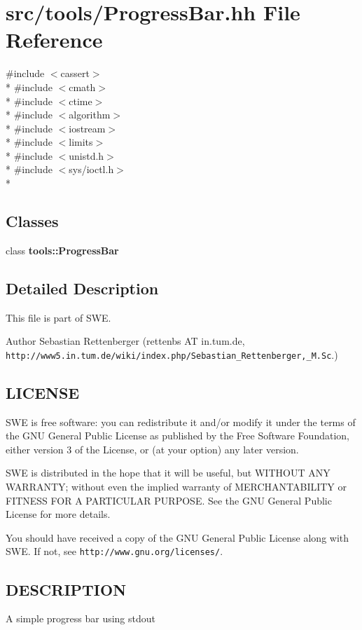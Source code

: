 \section{src/tools/\-Progress\-Bar.hh File Reference}
\label{ProgressBar_8hh}
{\ttfamily \#include $<$cassert$>$}\\*
{\ttfamily \#include $<$cmath$>$}\\*
{\ttfamily \#include $<$ctime$>$}\\*
{\ttfamily \#include $<$algorithm$>$}\\*
{\ttfamily \#include $<$iostream$>$}\\*
{\ttfamily \#include $<$limits$>$}\\*
{\ttfamily \#include $<$unistd.\-h$>$}\\*
{\ttfamily \#include $<$sys/ioctl.\-h$>$}\\*
\subsection*{Classes}
\begin{DoxyCompactItemize}
\item 
class {\bf tools\-::\-Progress\-Bar}
\end{DoxyCompactItemize}


\subsection{Detailed Description}
This file is part of S\-W\-E.

\begin{DoxyAuthor}{Author}
Sebastian Rettenberger (rettenbs A\-T in.\-tum.\-de, {\tt http\-://www5.\-in.\-tum.\-de/wiki/index.\-php/\-Sebastian\-\_\-\-Rettenberger,\-\_\-\-M.\-Sc}.)
\end{DoxyAuthor}
\subsection{L\-I\-C\-E\-N\-S\-E}\label{Writer_8hh_LICENSE}
S\-W\-E is free software\-: you can redistribute it and/or modify it under the terms of the G\-N\-U General Public License as published by the Free Software Foundation, either version 3 of the License, or (at your option) any later version.

S\-W\-E is distributed in the hope that it will be useful, but W\-I\-T\-H\-O\-U\-T A\-N\-Y W\-A\-R\-R\-A\-N\-T\-Y; without even the implied warranty of M\-E\-R\-C\-H\-A\-N\-T\-A\-B\-I\-L\-I\-T\-Y or F\-I\-T\-N\-E\-S\-S F\-O\-R A P\-A\-R\-T\-I\-C\-U\-L\-A\-R P\-U\-R\-P\-O\-S\-E. See the G\-N\-U General Public License for more details.

You should have received a copy of the G\-N\-U General Public License along with S\-W\-E. If not, see {\tt http\-://www.\-gnu.\-org/licenses/}.\subsection{D\-E\-S\-C\-R\-I\-P\-T\-I\-O\-N}\label{NetCdfWriter_8hh_DESCRIPTION}
A simple progress bar using stdout 